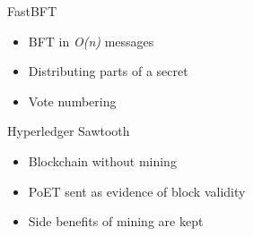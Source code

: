 \documentclass{beamer}
\begin{document}
	\begin{frame}{FastBFT} %
		\begin{itemize}
			\item BFT in \textit{O(n)} messages
			\item Distributing parts of a secret
			\item Vote numbering
		\end{itemize}
	\end{frame}

	\begin{frame}{Hyperledger Sawtooth}	%
		\begin{itemize}
			\item Blockchain without mining
			\item PoET sent as evidence of block validity
			\item Side benefits of mining are kept
		\end{itemize}
	\end{frame}
\end{document}
